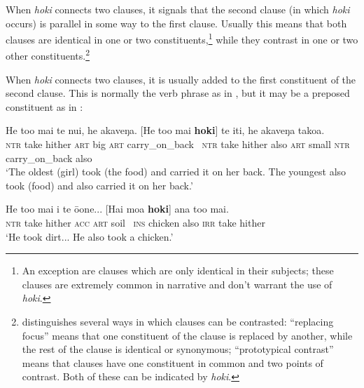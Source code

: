 When \textit{hoki} connects two clauses, it signals that the second clause (in which \textit{hoki} occurs) is parallel in some way to the first clause. Usually this means that both clauses are identical in one or two constituents,\footnote{\label{fn:197}An exception are clauses which are only identical in their subjects; these clauses are extremely common in narrative and don’t warrant the use of \textit{hoki}.} while they contrast in one or two other constituents.\footnote{\label{fn:198}\citet[92]{Levinsohn2007} distinguishes several ways in which clauses can be contrasted: “replacing focus” means that one constituent of the clause is replaced by another, while the rest of the clause is identical or synonymous; “prototypical contrast” means that clauses have one constituent in common and two points of contrast. Both of these can be indicated by \textit{hoki}.} 

When \textit{hoki} connects two clauses, it is usually added to the first constituent of the second clause. This is normally the verb phrase as in , but it may be a preposed constituent as in :

\ea\label{ex:4.139}
\gll He to{\ꞌ}o mai te nui, he {\ꞌ}akaveŋa. [He to{\ꞌ}o mai \textbf{hoki}] te {\ꞌ}iti,  he {\ꞌ}akaveŋa tako{\ꞌ}a.\\
\textsc{ntr} take hither \textsc{art} big \textsc{art} carry\_on\_back ~\textsc{ntr} take hither also \textsc{art} small  \textsc{ntr} carry\_on\_back also\\

\glt 
‘The oldest (girl) took (the food) and carried it on her back. The youngest also took (food) and also carried it on her back.’ \textstyleExampleref{[Mtx-7-24.041–042]}
\z

\ea\label{ex:4.140}
\gll He to{\ꞌ}o mai i te {\ꞌ}ō{\ꞌ}one... [Hai moa \textbf{hoki}] ana to{\ꞌ}o mai. \\
\textsc{ntr} take hither \textsc{acc} \textsc{art} soil ~\textsc{ins} chicken also \textsc{irr} take hither \\

\glt 
‘He took dirt... He also took a chicken.’ \textstyleExampleref{[Ley-5-28.002-004]}
\z {}
